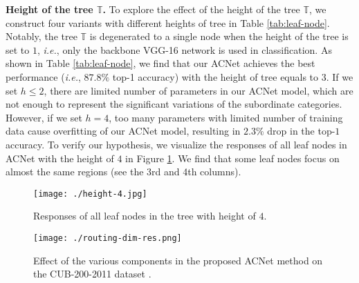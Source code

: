 \documentclass[10pt,twocolumn,letterpaper]{article}
\def\ie{{\em i.e.}}
\begin{document}
{\flushleft \textbf{Height of the tree $\mathbb{T}$.}}
To explore the effect of the height of the tree $\mathbb{T}$, we construct four variants with different heights of tree in Table \ref{tab:leaf-node}. Notably, the tree $\mathbb{T}$ is degenerated to a single node when the height of the tree is set to $1$, \ie, only the backbone VGG-16 network is used in classification.  As shown in Table \ref{tab:leaf-node}, we find that our ACNet achieves the best performance (\ie, $87.8\%$ top-1 accuracy) with the height of tree equals to $3$. If we set $h\leq2$, there are limited number of parameters in our ACNet model, which are not enough to represent the significant variations of the subordinate categories. However, if we set $h=4$, too many parameters with limited number of training data cause overfitting of our ACNet model, resulting in $2.3\%$ drop in the top-$1$ accuracy. To verify our hypothesis, we visualize the responses of all leaf nodes in ACNet with the height of $4$ in Figure \ref{fig:leaf-node}. We find that some leaf nodes focus on almost the same regions (see the 3rd and 4th columns).

\begin{figure}[h]
	\centering
	\texttt{[image: ./height-4.jpg]}
	\caption{Responses of all leaf nodes in the tree with height of $4$.}
	\vspace{-2mm}
	\label{fig:leaf-node}
\end{figure}

\begin{figure}[t]
\centering
\texttt{[image: ./routing-dim-res.png]}
\caption{Effect of the various components in the proposed ACNet method on the CUB-200-2011 dataset \cite{report-wahcub_200_2011}.}
\vspace{-2mm}
\label{fig:ablation}
\end{figure}
\end{document}
